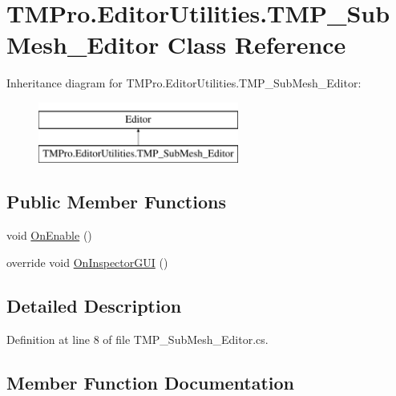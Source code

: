 \hypertarget{class_t_m_pro_1_1_editor_utilities_1_1_t_m_p___sub_mesh___editor}{}\section{T\+M\+Pro.\+Editor\+Utilities.\+T\+M\+P\+\_\+\+Sub\+Mesh\+\_\+\+Editor Class Reference}
\label{class_t_m_pro_1_1_editor_utilities_1_1_t_m_p___sub_mesh___editor}
Inheritance diagram for T\+M\+Pro.\+Editor\+Utilities.\+T\+M\+P\+\_\+\+Sub\+Mesh\+\_\+\+Editor\+:\begin{figure}[H]
\begin{center}
\leavevmode
\includegraphics[height=2.000000cm]{class_t_m_pro_1_1_editor_utilities_1_1_t_m_p___sub_mesh___editor}
\end{center}
\end{figure}
\subsection*{Public Member Functions}
\begin{DoxyCompactItemize}
\item 
void \mbox{\hyperlink{class_t_m_pro_1_1_editor_utilities_1_1_t_m_p___sub_mesh___editor_a7a75efaf6f5dc34a8d2f47c75559c13e}{On\+Enable}} ()
\item 
override void \mbox{\hyperlink{class_t_m_pro_1_1_editor_utilities_1_1_t_m_p___sub_mesh___editor_add035dbc8fab6591f58aab5801dad898}{On\+Inspector\+G\+UI}} ()
\end{DoxyCompactItemize}


\subsection{Detailed Description}


Definition at line 8 of file T\+M\+P\+\_\+\+Sub\+Mesh\+\_\+\+Editor.\+cs.



\subsection{Member Function Documentation}
\mbox{\label{class_t_m_pro_1_1_editor_utilities_1_1_t_m_p___sub_mesh___editor_a7a75efaf6f5dc34a8d2f47c75559c13e}} 

